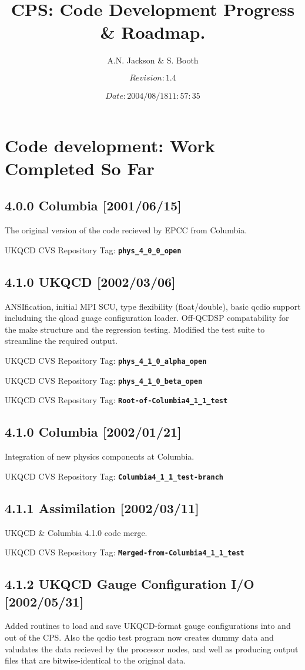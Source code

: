 \documentclass[12pt]{article}
\title{CPS: Code Development Progress \& Roadmap.}
\author{A.N. Jackson \& S. Booth}
\date{\mbox{\small $$Revision: 1.4 $$  $$Date: 2004/08/18 11:57:35 $$}}
\newcommand{\ukqcdtag}[1]{{\small{UKQCD CVS Repository Tag: }{\bf{\tt{#1}}}}}
\begin{document}
\maketitle

\tableofcontents
\newpage

\section{Code development: Work Completed So Far}

\subsection{4.0.0 Columbia [2001/06/15]}
The original version of the code recieved by EPCC from Columbia.

\ukqcdtag{phys\_4\_0\_0\_open}

\subsection{4.1.0  UKQCD [2002/03/06]}
ANSIfication, initial MPI SCU, type flexibility (float/double), basic qcdio
support includuing the qload guage configuration loader.  Off-QCDSP
compatability for the make structure and the regression testing.  Modified the
test suite to streamline the required output.

\ukqcdtag{phys\_4\_1\_0\_alpha\_open}

\ukqcdtag{phys\_4\_1\_0\_beta\_open}

\ukqcdtag{Root-of-Columbia4\_1\_1\_test}

\subsection{4.1.0 Columbia [2002/01/21]}
Integration of new physics components at Columbia.

\ukqcdtag{Columbia4\_1\_1\_test-branch}

\subsection{4.1.1 Assimilation [2002/03/11]}
UKQCD \& Columbia 4.1.0 code merge.

\ukqcdtag{Merged-from-Columbia4\_1\_1\_test}

\subsection{4.1.2 UKQCD Gauge Configuration I/O [2002/05/31]}
Added routines to load and save UKQCD-format gauge configurations into and out
of the CPS.  Also the qcdio test program now creates dummy data and valudates
the data recieved by the processor nodes, and well as producing output files
that are bitwise-identical to the original data.
\end{document}
